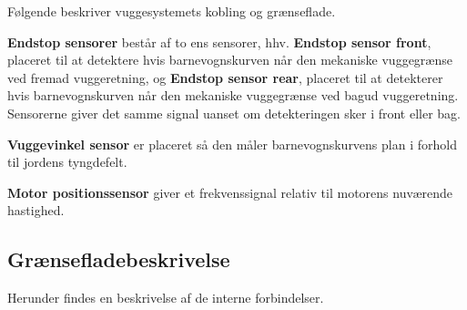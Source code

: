 Følgende beskriver vuggesystemets kobling og grænseflade.


\vspace{5mm} 

\textbf{Endstop sensorer} består af to ens sensorer, hhv. \textbf{Endstop sensor front}, placeret til at detektere hvis barnevognskurven når den mekaniske vuggegrænse ved fremad vuggeretning, og \textbf{Endstop sensor rear}, placeret til at detekterer hvis barnevognskurven når den mekaniske vuggegrænse ved bagud vuggeretning. Sensorerne giver det samme signal uanset om detekteringen sker i front eller bag.

\vspace{5mm}

\textbf{Vuggevinkel sensor} er placeret så den måler barnevognskurvens plan i forhold til jordens tyngdefelt. 

\vspace{5mm}

\textbf{Motor positionssensor} giver et frekvenssignal relativ til motorens nuværende hastighed. 

\subsection{Grænsefladebeskrivelse}
Herunder findes en beskrivelse af de interne forbindelser. 

